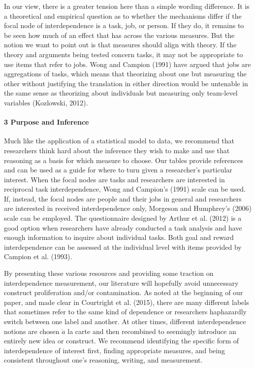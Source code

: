\documentclass[english,,man]{apa6}
\let\oldparagraph\paragraph
\renewcommand{\paragraph}[1]{\oldparagraph{#1}\mbox{}}
\theoremstyle{definition}
\theoremstyle{definition}
\theoremstyle{definition}
\theoremstyle{remark}
\begin{document}
In our view, there is a greater tension here than a simple wording
difference. It is a theoretical and empirical question as to whether the
mechanisms differ if the focal node of interdependence is a task, job,
or person. If they do, it remains to be seen how much of an effect that
has across the various measures. But the notion we want to point out is
that measures should align with theory. If the theory and arguments
being tested concern tasks, it may not be appropriate to use items that
refer to jobs. Wong and Campion (1991) have argued that jobs are
aggregations of tasks, which means that theorizing about one but
measuring the other without justifying the translation in either
direction would be untenable in the same sense as theorizing about
individuals but measuring only team-level variables (Kozlowski, 2012).

\hypertarget{purpose-and-inference}{%
\paragraph{3 Purpose and Inference}\label{purpose-and-inference}}

Much like the application of a statistical model to data, we recommend
that researchers think hard about the inference they wish to make and
use that reasoning as a basis for which measure to choose. Our tables
provide references and can be used as a guide for where to turn given a
researcher's particular interest. When the focal nodes are tasks and
researchers are interested in reciprocal task interdependence, Wong and
Campion's (1991) scale can be used. If, instead, the focal nodes are
people and their jobs in general and researchers are interested in
received interdependence only, Morgeson and Humphrey's (2006) scale can
be employed. The questionnaire designed by Arthur et al. (2012) is a
good option when researchers have already conducted a task analysis and
have enough information to inquire about individual tasks. Both goal and
reward interdependence can be assessed at the individual level with
items provided by Campion et al. (1993).

By presenting these various resources and providing some traction on
interdependence measurement, our literature will hopefully avoid
unnecessary construct proliferation and/or contamination. As noted at
the beginning of our paper, and made clear in Courtright et al. (2015),
there are many different labels that sometimes refer to the same kind of
dependence or researchers haphazardly switch between one label and
another. At other times, different interdependence notions are chosen
\(\grave{a}\) la carte and then recombined to seemingly introduce an
entirely new idea or construct. We recommend identifying the specific
form of interdependence of interest first, finding appropriate measures,
and being consistent throughout one's reasoning, writing, and
measurement.
\end{document}
